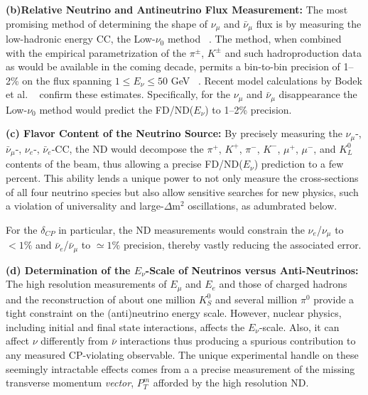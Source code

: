 \vspace{0.25cm} 
 
\noindent 
{\bf  (b)Relative Neutrino and Antineutrino Flux Measurement:} The most promising method of determining 
the shape of  $\nu_\mu$ and $\bar \nu_\mu$ flux is by measuring the low-hadronic energy CC, the Low-$\nu_0$ method ~\cite{MISHRA-Nu0}. The method, when combined with the empirical parametrization of the $\pi^{\pm}$, $K^{\pm}$ 
and such hadroproduction data as would be available in the coming decade, permits a bin-to-bin precision of 1--2\% on 
the flux spanning $1 \leq E_\nu \leq 50$ GeV ~\cite{ND-REL-FLUX}. 
Recent model calculations by Bodek et al. ~\cite{Bodek:2012uu} confirm these estimates. 
Specifically, for the $\nu_\mu$ and $\bar \nu_\mu$ disappearance the Low-$\nu_0$ method would predict the 
FD/ND($E_\nu$) to 1--2\% precision. 

\vspace{0.25cm} 
\noindent 
{\bf (c) Flavor Content of the Neutrino Source:} By precisely measuring the $\nu_\mu$-, $\bar \nu_\mu$-, $\nu_e$-, $\bar \nu_e$-CC, 
the ND would decompose the $\pi^+$, $K^+$, $\pi^-$, $K^-$, $\mu^+$, $\mu^-$, and $K^0_L$ contents of the beam, thus 
allowing a precise FD/ND($E_\nu$) prediction to a few percent.  This ability lends a unique power to 
not only measure the cross-sections of all four neutrino species but also allow sensitive searches for new 
physics, such a violation of universality and large-$\Delta$m$^2$ oscillations,  as adumbrated below. 

\noindent
For the $\delta_{CP}$ in particular, the ND measurements would constrain the $\nu_e$/$\nu_\mu$ to 
$<1\%$ and $\bar \nu_e$/$\bar \nu_\mu$ to $\simeq 1\%$ precision, thereby vastly reducing the associated error. 



\vspace{0.25cm} 
\noindent 
{\bf (d) Determination of the $E_\nu$-Scale of Neutrinos versus Anti-Neutrinos:} The high resolution 
measurements of $E_\mu$ and $E_e$ and those of charged hadrons and the reconstruction of about one 
million $K^0_S$ and several million $\pi^0$ provide a tight constraint on the (anti)neutrino energy scale. 
However,  nuclear physics, including initial and final state interactions, 
 affects the $E_\nu$-scale. Also, it can affect $\nu$ differently from $\bar\nu$ interactions thus  
producing a spurious contribution to any measured CP-violating observable. 
The unique experimental handle on these seemingly intractable effects comes from a 
a precise measurement of the missing transverse momentum {\it vector},{ \bf{ $P^m_T$}} afforded by the 
high resolution ND. 


